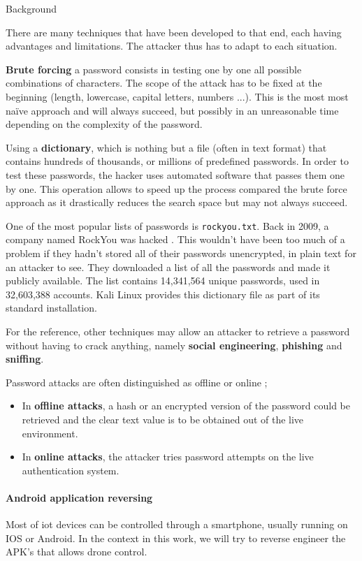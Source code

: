 \begin{chaptercover}{Background}
\begin{indentbox}{1cm}
There are many techniques that have been developed to that end, each having advantages and limitations. The attacker thus has to adapt to each situation.

\textbf{Brute forcing} a password consists in testing one by one all possible combinations of characters. The scope of the attack has to be fixed at the beginning (length, lowercase, capital letters, numbers ...). This is the most most naïve approach and will always succeed, but possibly in an unreasonable time depending on the complexity of the password.

Using a \textbf{dictionary}, which is nothing but a file (often in text format) that contains hundreds of thousands, or millions of predefined passwords. In order to test these passwords, the hacker uses automated software that passes them one by one. This operation allows to speed up the process compared the brute force approach as it drastically reduces the search space but may not always succeed.

\begin{info}
One of the most popular lists of passwords is \texttt{rockyou.txt}. Back in 2009, a company named RockYou was hacked \cite{rockyou-hack}. This wouldn't have been too much of a problem if they hadn't stored all of their passwords unencrypted, in plain text for an attacker to see. They downloaded a list of all the passwords and made it publicly available. The list contains 14,341,564 unique passwords, used in 32,603,388 accounts. Kali Linux provides this dictionary file as part of its standard installation.
\end{info}

For the reference, other techniques may allow an attacker to retrieve a password without having to crack anything, namely \textbf{social engineering}, \textbf{phishing} and \textbf{sniffing}.

Password attacks are often distinguished as offline or online ;
\begin{itemize}
  \item In \textbf{offline attacks}, a hash or an encrypted version of the password could be retrieved and the clear text value is to be obtained out of the live environment.
  \item In \textbf{online attacks}, the attacker tries password attempts on the live authentication system.
\end{itemize}
\end{indentbox}

\paragraph{Android application reversing} Most of \acrshort{iot} devices can be controlled through a smartphone, usually running on IOS or Android. In the context in this work, we will try to reverse engineer the APK’s that allows drone control.


\end{chaptercover}
